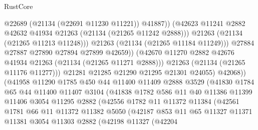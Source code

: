\begin{lexlean}{RustCore}
\begin{coremodule}
                                  @22689
                                  (@21134 (@22691 @11230 @11221))
                                  @41887))
                              (@42623
                                @11241
                                @2882
                                @42632
                                @41934
                                @21263
                                (@21134 (@21265 @11242 @2888)))
                              @21263
                              (@21134 (@21265 @11213 @11248)))
                            @21263
                            (@21134 (@21265 @11184 @11249)))
                          @27884
                          @27887
                          @27890
                          @27894
                          @27899
                          @42659))
                      (@42670 @11270 @2882 @42676 @41934 @21263 (@21134 (@21265 @11271 @2888)))
                      @21263
                      (@21134 (@21265 @11176 @11277)))
                    @21281
                    @21285
                    @21290
                    @21295
                    @21301
                    @24055)
                  @42068))
              (@41958
                @11290
                @1785
                @450
                @44
                @11400
                @11409
                @2888
                @3529
                (@41830
                  @1784
                  @65
                  @44
                  @11400
                  @11407
                  @3104
                  (@41838
                    @1782
                    @586
                    @11
                    @40
                    @11386
                    @11399
                    @11406
                    @3054
                    @11295
                    @2882
                    (@42556
                      @1782
                      @11
                      @11372
                      @11384
                      (@42561
                        @1781
                        @66
                        @11
                        @11372
                        @11382
                        @5050
                        (@42187
                          @853
                          @11
                          @65
                          @11327
                          @11371
                          @11381
                          @3054
                          @11303
                          @2882
                          (@42198
                            @11327
                            (@42204

\end{coremodule}
\end{lexlean}
